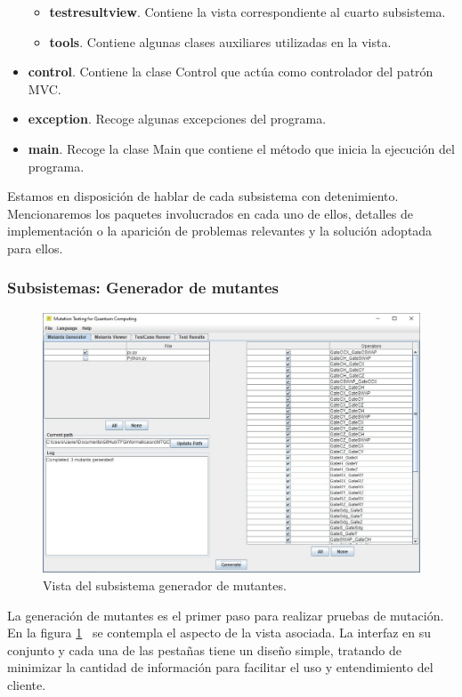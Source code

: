 \begin{itemize}
\begin{itemize}
	\item \textbf{testresultview}. Contiene la vista correspondiente al cuarto subsistema.
	\item \textbf{tools}. Contiene algunas clases auxiliares utilizadas en la vista.
	\end{itemize}
\item \textbf{control}. Contiene la clase Control que actúa como controlador del patrón MVC.
\item \textbf{exception}. Recoge algunas excepciones del programa.
\item \textbf{main}. Recoge la clase Main que contiene el método que inicia la ejecución del programa.
\end{itemize}

Estamos en disposición de hablar de cada subsistema con detenimiento. Mencionaremos los paquetes involucrados en cada uno de ellos, detalles de implementación o la aparición de problemas relevantes y la solución adoptada para ellos.

\subsubsection{Subsistemas: Generador de mutantes}

\begin{figure}[htb]
\begin{center}
\includegraphics[scale=0.45]{images/vista1}
\end{center}
\caption{Vista del subsistema generador de mutantes.}
\label{fig:vista1}
\end{figure}

La generación de mutantes es el primer paso para realizar pruebas de mutación. En la figura \ref{fig:vista1} \ se contempla el aspecto de la vista asociada. La interfaz en su conjunto y cada una de las pestañas tiene un diseño simple, tratando de minimizar la cantidad de información para facilitar el uso y entendimiento del cliente.

